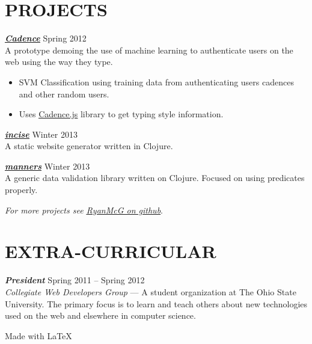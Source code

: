 \documentclass[line,letterpaper]{resume}
\begin{document}
\begin{resume}
    \section{\uppercase{Projects}}
    {\sl\textbf{\underline{\href{https://github.com/RyanMcG/Cadence}{Cadence}}}}
    \hfill Spring 2012\\
    A prototype demoing the use of machine learning to authenticate users on the
    web using the way they type.
    \begin{itemize}
        \item SVM Classification using training data from authenticating users
            cadences and other random users.
        \item Uses
            \underline{\href{https://github.com/RyanMcG/Cadence-js}{Cadence.js}}
            library to get typing style information.
    \end{itemize}

    \vspace{-6pt}
    {\sl\textbf{\underline{\href{https://github.com/RyanMcG/incise}{incise}}}}
    \hfill Winter 2013\\
    A static website generator written in Clojure.
    \vspace{-6pt}

    {\sl\textbf{\underline{\href{https://github.com/RyanMcG/manners}{manners}}}}
    \hfill Winter 2013\\
    A generic data validation library written on Clojure.
    Focused on using predicates properly.

    \vspace{-6pt}

    \hfill \emph{For more projects see
    \underline{\href{https://github.com/RyanMcG}{RyanMcG on github}}}.

    \vspace{-15pt}

    \section{\uppercase{Extra-Curricular}}
    {\sl\textbf{President}} \hfill Spring 2011 -- Spring 2012\\
    \emph{Collegiate Web Developers Group} --- A student organization at The
    Ohio State University. The primary focus is to learn and teach others about
    new technologies used on the web and elsewhere in computer science.

\end{resume}

\vspace{30pt}

\hfill Made with \LaTeX{}
\end{document}
